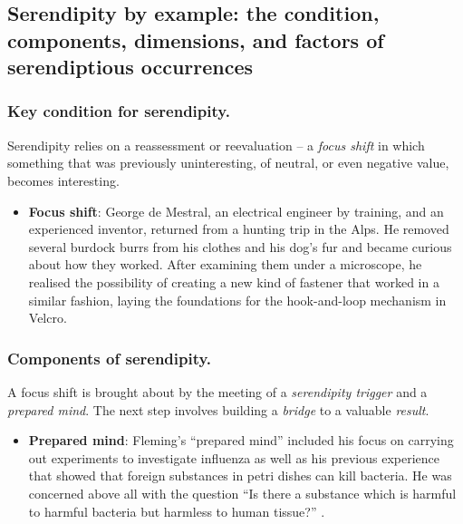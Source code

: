 %

\subsection{Serendipity by example: the condition, components, dimensions, and factors of serendiptious occurrences} \label{sec:by-example}


\subsubsection*{Key condition for serendipity.}

Serendipity relies on a reassessment or reevaluation -- a \emph{focus shift} in which something that was previously uninteresting, of neutral, or even negative value, becomes interesting.

\begin{itemize}
\item \textbf{Focus shift}: George de Mestral, an electrical engineer
  by training, and an experienced inventor, returned from a hunting
  trip in the Alps.  He removed several burdock burrs from his clothes
  and his dog's fur and became curious about how they worked. After
  examining them under a microscope, he realised the possibility of
  creating a new kind of fastener that worked in a similar fashion,
  laying the foundations for the hook-and-loop mechanism in Velcro\texttrademark.
\end{itemize}

\subsubsection*{Components of serendipity.}

A focus shift is brought about by the meeting of a \emph{serendipity trigger} and a \emph{prepared mind}.  The next step involves building a \emph{bridge} to a valuable \emph{result}.

\begin{itemize}
\item \textbf{Prepared mind}: 
Fleming's ``prepared mind'' included his focus
on carrying out experiments to investigate influenza as well as his
previous experience that showed that foreign substances in petri dishes can kill
bacteria.  He was concerned above all with the question ``Is there a
substance which is harmful to harmful bacteria but harmless to human
tissue?''  \cite[p. 161]{roberts}.
\end{itemize}

